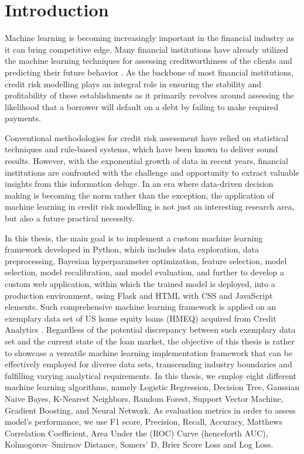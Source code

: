 \chapter{Introduction}
\label{chap:one}


Machine learning is becoming increasingly important in the financial industry as it can bring competitive edge. Many financial institutions have already utilized the machine learning techniques for assessing creditworthiness of the clients and predicting their future behavior \citep{PwC2023}. \newline
As the backbone of most financial institutions, credit risk modelling plays an integral role in ensuring the stability and profitability of these establishments as it primarily revolves around assessing the likelihood that a borrower will default on a debt by failing to make required payments.

Conventional methodologies for credit risk assessment have relied on statistical techniques and rule-based systems, which have been known to deliver sound results.
However, with the exponential growth of data in recent years, financial institutions are confronted with the challenge and opportunity to extract valuable insights from this information deluge.
In an era where data-driven decision making is becoming the norm rather than the exception, the application of machine learning in credit risk modelling is not just an interesting research area, but also a future practical necessity.

In this thesis, the main goal is to implement a custom machine learning framework developed in Python, which includes data exploration, data preprocessing, Bayesian hyperparameter optimization, feature selection, model selection, model recalibration, and model evaluation, and further to develop a custom web application, within which the trained model is deployed, into a production environment, using Flask and HTML with CSS and JavaScript elements.
Such comprehensive machine learning framework is applied on an exemplary data set of US home equity loans (HMEQ) acquired from Credit Analytics \citep{baesens2016credit}.
Regardless of the potential discrepancy between such exemplary data set and the current state of the loan market, the objective of this thesis is rather to showcase a versatile machine learning implementation framework that can be effectively employed for diverse data sets, transcending industry boundaries and fulfilling varying analytical requirements.
In this thesis, we employ eight different machine learning algorithms, namely Logistic Regression, Decision Tree, Gaussian Naive Bayes, K-Nearest Neighbors, Random Forest, Support Vector Machine, Gradient Boosting, and Neural Network.
As evaluation metrics in order to assess model's performance, we use F1 score, Precision, Recall, Accuracy, Matthews Correlation Coefficient, Area Under the (ROC) Curve (henceforth AUC), Kolmogorov--Smirnov Distance, Somers' D, Brier Score Loss and Log Loss.

